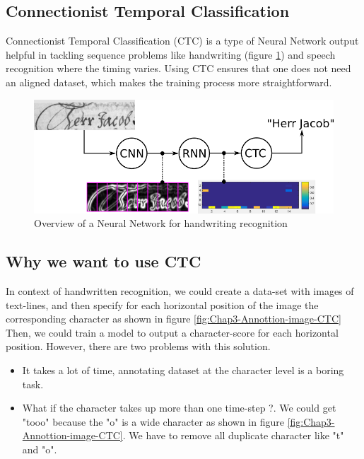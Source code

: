 \subsection{Connectionist Temporal Classification}
Connectionist Temporal Classification (CTC) \cite{hannun2017sequence} is a type of Neural Network output helpful
in tackling sequence problems like handwriting (figure \ref{fig:Chap3-Overview-CTC}) and speech recognition where the timing varies.
Using CTC ensures that one does not need an aligned dataset, which makes the training process
more straightforward.
\begin{figure}[H]
	\centering
	\includegraphics[width=\textwidth]{img/Chap3/Overview-CTC}
	\caption{ Overview of a Neural Network for handwriting recognition }
	\label{fig:Chap3-Overview-CTC}
\end{figure}

\subsection{Why we want to use CTC}
In context of handwritten recognition, we could create a data-set with
images of text-lines, and then specify for each horizontal position of the image
the corresponding character as shown in figure \ref{fig:Chap3-Annottion-image-CTC} Then, we could train a model to output
a character-score for each horizontal position. However, there are two problems with this
solution.
\begin{itemize}
	\item It takes a lot of time, annotating dataset at the character level is a boring task.
	\item What if the character takes up more than one time-step ?. We could get "tooo" because
	      the "o" is a wide character as shown in figure \ref{fig:Chap3-Annottion-image-CTC}. We have to remove all duplicate character
	      like "t" and "o".
\end{itemize}

